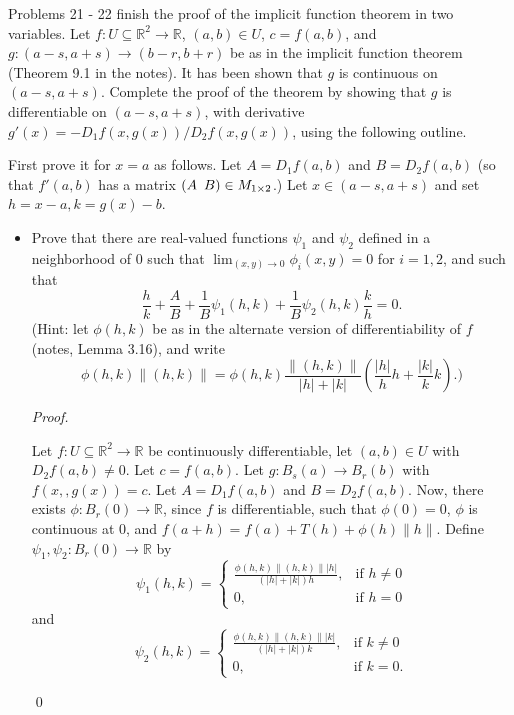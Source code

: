 \documentclass[12pt]{article}
\newenvironment{problem}[2][Problem]{\begin{trivlist}
\item[\hskip \labelsep {\bfseries #1}\hskip \labelsep {\bfseries
#2.}]}{\end{trivlist}}
\newenvironment{sol}
    {\emph{Proof.}
    }
    {
    \qed
    }
\begin{document}
Problems 21 - 22 finish the proof of the implicit function theorem in two variables. Let $f : U \subseteq \mathbb{R}^2 \to \mathbb{R}$, $(a,b) \in U$, $c = f(a,b)$, and $g : (a-s,a+s) \to (b-r,b+r)$ be as in the implicit function theorem (Theorem 9.1 in the notes). It has been shown that $g$ is continuous on $(a-s, a+s)$. Complete the proof of the theorem by showing that $g$ is differentiable on $(a-s,a+s)$, with derivative $g'(x) = -D_1f(x,g(x))/D_2f(x,g(x))$, using the following outline.

\begin{problem}{21}
First prove it for $x = a$ as follows. Let $A = D_1f(a,b)$ and $B = D_2f(a,b)$ (so that $f'(a,b)$ has a matrix $(A \hspace{.5em} B) \in M_{1 \times 2}$.) Let $x \in (a-s,a+s)$ and set $h = x-a,k = g(x)-b$.

\begin{itemize}
    \item[(a)] Prove that there are real-valued functions $\psi_1$ and $\psi_2$ defined in a neighborhood of 0 such that $\lim_{(x,y)\to 0}\phi_i(x,y) = 0$ for $i = 1,2$, and such that $$\frac{h}{k} + \frac{A}{B} + \frac{1}{B}\psi_1(h,k) + \frac{1}{B}\psi_2(h,k)\frac{k}{h} = 0.$$ (Hint: let $\phi(h,k)$ be as in the alternate version of differentiability of $f$ (notes, Lemma 3.16), and write $$\phi(h,k)\lVert (h,k) \rVert = \phi(h,k) \frac{\lVert (h,k) \rVert}{\left| h \right| + \left| k \right|} \left( \frac{\left| h \right|}{h}h + \frac{\left| k \right|}{k}k  \right).)$$
    
    \begin{sol}
    Let $f : U \subseteq \mathbb{R}^2 \to \mathbb{R}$ be continuously differentiable, let $(a,b) \in U$ with $D_2f(a,b) \neq 0$. Let $c = f(a,b)$. Let $g : B_s(a) \to B_r(b)$ with $f(x,,g(x)) = c$. Let $A = D_1f(a,b)$ and $B = D_2f(a,b)$. Now, there exists $\phi : B_r(0) \to \mathbb{R}$, since $f$ is differentiable, such that $\phi(0) = 0$, $\phi$ is continuous at 0, and $f(a+h) = f(a) + T(h) + \phi(h)\lVert h \rVert$. Define $\psi_1,\psi_2 : B_r(0) \to \mathbb{R}$ by $$\psi_1(h,k) = \begin{cases} 
      \frac{\phi(h,k) \lVert (h,k) \rVert \left| h \right|}{(\left| h \right| + \left| k \right| )h}, & \text{if } h \neq 0 \\
      0, & \text{if } h = 0
   \end{cases}$$
   and $$\psi_2(h,k) = \begin{cases} 
      \frac{\phi(h,k) \lVert (h,k) \rVert \left| k \right|}{(\left| h \right| + \left| k \right| )k}, & \text{if } k \neq 0 \\
      0, & \text{if } k = 0.
   \end{cases}$$
   

\end{sol}
\end{itemize}
\end{problem}
\end{document}
